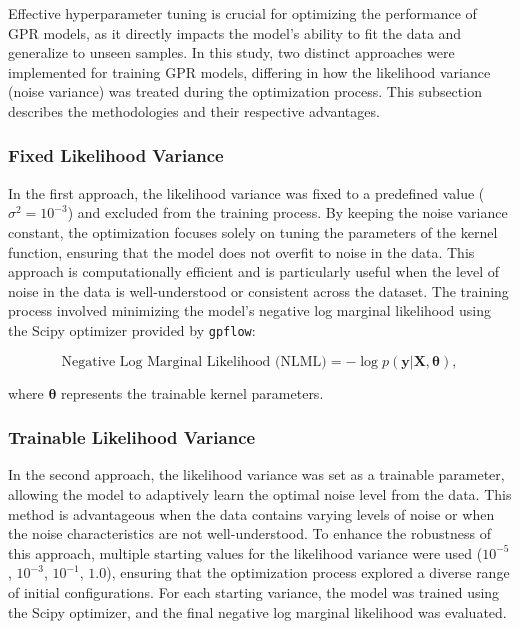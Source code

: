 Effective hyperparameter tuning is crucial for optimizing the performance of \ac{GPR} models, as it directly impacts the model's ability to fit the data and generalize to unseen samples. In this study, two distinct approaches were implemented for training \ac{GPR} models, differing in how the likelihood variance (noise variance) was treated during the optimization process. This subsection describes the methodologies and their respective advantages.

\subsubsection{Fixed Likelihood Variance}

In the first approach, the likelihood variance was fixed to a predefined value ($\sigma^2 = 10^{-3}$) and excluded from the training process. By keeping the noise variance constant, the optimization focuses solely on tuning the parameters of the kernel function, ensuring that the model does not overfit to noise in the data. This approach is computationally efficient and is particularly useful when the level of noise in the data is well-understood or consistent across the dataset. The training process involved minimizing the model's negative log marginal likelihood using the Scipy optimizer provided by \texttt{gpflow}:

\begin{equation}
\text{Negative Log Marginal Likelihood (NLML)} = -\log p(\mathbf{y} | \mathbf{X}, \boldsymbol{\theta}),
\end{equation}

where $\boldsymbol{\theta}$ represents the trainable kernel parameters.

\subsubsection{Trainable Likelihood Variance}

In the second approach, the likelihood variance was set as a trainable parameter, allowing the model to adaptively learn the optimal noise level from the data. This method is advantageous when the data contains varying levels of noise or when the noise characteristics are not well-understood. To enhance the robustness of this approach, multiple starting values for the likelihood variance were used ($10^{-5}$, $10^{-3}$, $10^{-1}$, $1.0$), ensuring that the optimization process explored a diverse range of initial configurations. For each starting variance, the model was trained using the Scipy optimizer, and the final negative log marginal likelihood was evaluated.

